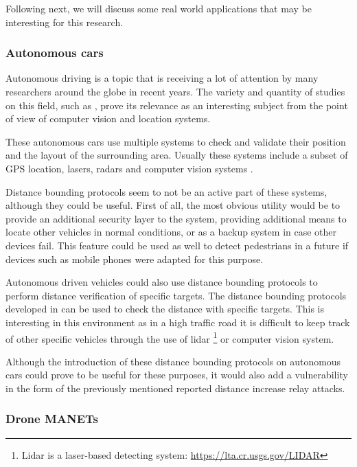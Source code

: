 \documentclass{article}
\begin{document}
Following next, we will discuss some real world applications that may be interesting for this research.

\subsubsection{Autonomous cars}

Autonomous driving is a topic that is receiving a lot of attention by many researchers around the globe in recent years. The variety and quantity of studies on this field, such as \cite{franke1999autonomous,continentalautonomous,levinsontowards,geiger2012we}, prove its relevance as an interesting subject from the point of view of computer vision and location systems.

These autonomous cars use multiple systems to check and validate their position and the layout of the surrounding area. Usually these systems include a subset of GPS location, lasers, radars and computer vision systems \cite{continentalautonomous,levinsontowards}.

Distance bounding protocols seem to not be an active part of these systems, although they could be useful. First of all, the most obvious utility would be to provide an additional security layer to the system, providing additional means to locate other vehicles in normal conditions, or as a backup system in case other devices fail. This feature could be used as well to detect pedestrians in a future if devices such as mobile phones were adapted for this purpose.

Autonomous driven vehicles could also use distance bounding protocols to perform distance verification of specific targets. The distance bounding protocols developed in  \cite{rasmussen2010realization, capkun2006secure} can be used to check the distance with specific targets. This is interesting in this environment as in a high traffic road it is difficult to keep track of other specific vehicles through the use of lidar \footnote{Lidar is a laser-based detecting system: \url{https://lta.cr.usgs.gov/LIDAR}} or computer vision system.

Although the introduction of these distance bounding protocols on autonomous cars could prove to be useful for these purposes, it would also add a vulnerability in the form of the previously mentioned reported distance increase relay attacks.


\subsubsection{Drone MANETs}
\end{document}
